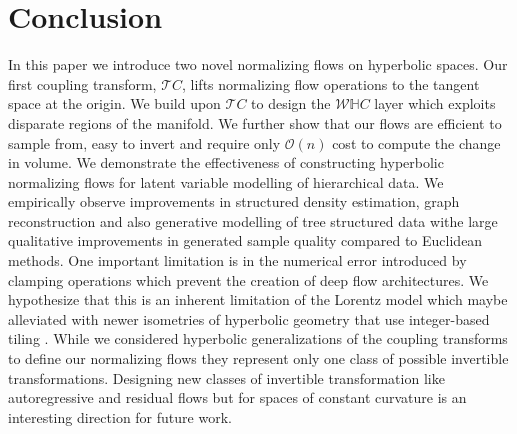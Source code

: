 \section{Conclusion}
In this paper we introduce two novel normalizing flows on hyperbolic spaces. Our first coupling transform, $\mathcal{T}C$, lifts normalizing flow operations to the tangent space at the origin. We build upon $\mathcal{T}C$ to design the $\mathcal{W}\mathbb{H}C$ layer which exploits disparate regions of the manifold. We further show that our flows are efficient to sample from, easy to invert and require only $\mathcal{O}(n)$ cost to compute the change in volume. We demonstrate the effectiveness of constructing hyperbolic normalizing flows for latent variable modelling of hierarchical data. We empirically observe improvements in structured density estimation, graph reconstruction and also generative modelling of tree structured data withe large qualitative improvements in generated sample quality compared to Euclidean methods. One important limitation is in the numerical error introduced by clamping operations which prevent the creation of deep flow architectures. We hypothesize that this is an inherent limitation of the Lorentz model which maybe alleviated with newer isometries of hyperbolic geometry that use integer-based tiling \cite{yu2019numerically}. While we considered hyperbolic generalizations of the coupling transforms to define our normalizing flows they represent only one class of possible invertible transformations. Designing new classes of invertible transformation like autoregressive and residual flows but for spaces of constant curvature is an interesting direction for future work.